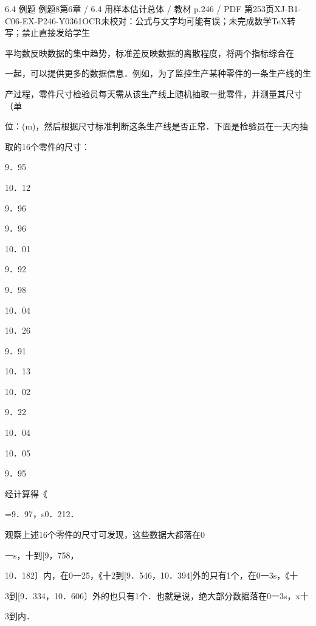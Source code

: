 \begin{bankitem}{6.4 例题 例题8}{第6章 / 6.4 用样本估计总体 / 教材 p.246 / PDF 第253页}{XJ-B1-C06-EX-P246-Y0361}{OCR未校对：公式与文字均可能有误；未完成数学TeX转写；禁止直接发给学生}
\begin{ocrdraft}
\par
平均数反映数据的集中趋势，标准差反映数据的离散程度，将两个指标综合在
\par
一起，可以提供更多的数据信息．例如，为了监控生产某种零件的一条生产线的生
\par
产过程，零件尺寸检验员每天需从该生产线上随机抽取一批零件，并测量其尺寸（单
\par
位：(m)，然后根据尺寸标准判断这条生产线是否正常．下面是检验员在一天内抽
\par
取的16个零件的尺寸：
\par
9．95
\par
10．12
\par
9．96
\par
9．96
\par
10．01
\par
9．92
\par
9．98
\par
10．04
\par
10．26
\par
9．91
\par
10．13
\par
10．02
\par
9．22
\par
10．04
\par
10．05
\par
9．95
\par
经计算得《
\par
=9．97，s0．212．
\par
观察上述16个零件的尺寸可发现，这些数据大都落在0
\par
一s，十到[9，758，
\par
10．182〕内，在0一25，《十2到[9．546，10．394]外的只有1个，在0一3s，《十
\par
3到[9．334，10．606〕外的也只有1个．也就是说，绝大部分数据落在0一3s，x十
\par
3到内．
\end{ocrdraft}
\end{bankitem}
